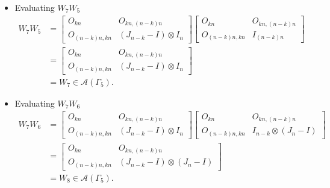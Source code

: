 \begin{itemize}
\item Evaluating $W_{7}W_{5}$
\begin{align*}
    W_7W_5
    &= \begin{bmatrix}
        O_{kn} & O_{kn, (n-k)n} \\
        O_{(n-k)n,kn} & (J_{n - k} - I) \otimes I_n
    \end{bmatrix}
    \begin{bmatrix}
        O_{kn} & O_{kn, (n-k)n} \\
        O_{(n-k)n,kn} & I_{(n-k)n}
    \end{bmatrix}\\
    &= \begin{bmatrix}
        O_{kn} & O_{kn, (n-k)n} \\
        O_{(n-k)n,kn} & (J_{n - k} - I) \otimes I_n
    \end{bmatrix}\\
    &= W_7\in\mathcal{A}(\Gamma_5).
\end{align*}

\item Evaluating $W_{7}W_{6}$
\begin{align*}
    W_7W_6
    &= \begin{bmatrix}
        O_{kn} & O_{kn, (n-k)n} \\
        O_{(n-k)n,kn} & (J_{n - k} - I) \otimes I_n
    \end{bmatrix}
    \begin{bmatrix}
        O_{kn} & O_{kn, (n-k)n} \\
        O_{(n-k)n,kn} & I_{n-k} \otimes (J_n-I)
    \end{bmatrix}\\
    &= \begin{bmatrix}
        O_{kn} & O_{kn, (n-k)n} \\
        O_{(n-k)n,kn} & (J_{n - k} - I) \otimes (J_n-I)
    \end{bmatrix}\\
    &= W_8\in\mathcal{A}(\Gamma_5).
\end{align*}


\end{itemize}
